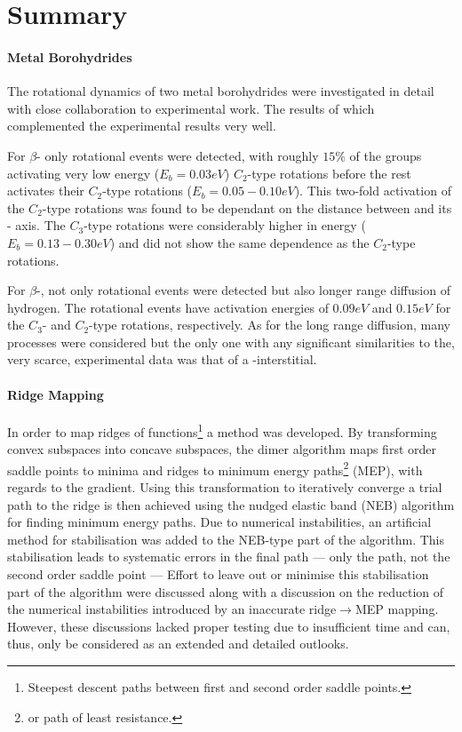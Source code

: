 \chapter{Summary}
\label{chap:summary}

\subsubsection{Metal Borohydrides}
The rotational dynamics of two metal borohydrides were investigated in detail with close collaboration to experimental work.
The results of which complemented the experimental results very well.

For $\beta$- only rotational events were detected, with roughly $15\%$ of the  groups activating very low energy ($E_b = 0.03\unit{eV}$) $C_2$-type rotations before the rest activates their $C_2$-type rotations ($E_b = 0.05 - 0.10 \unit{eV}$).
This two-fold activation of the $C_2$-type rotations was found to be dependant on the distance between  and its - axis.
The $C_3$-type rotations were considerably higher in energy ($E_b = 0.13 - 0.30 \unit{eV}$) and did not show the same dependence as the $C_2$-type rotations.

For $\beta$-, not only rotational events were detected but also longer range diffusion of hydrogen.
The rotational events have activation energies of $0.09 \unit{eV}$ and $0.15\unit{eV}$ for the $C_3$- and $C_2$-type rotations, respectively.
As for the long range diffusion, many processes were considered but the only one with any significant similarities to the, very scarce, experimental data was that of a -interstitial.

\subsubsection{Ridge Mapping}
In order to map ridges of functions\footnote{Steepest descent paths between first and second order saddle points.} a method was developed.
By transforming convex subspaces into concave subspaces, the dimer algorithm maps first order saddle points to minima and ridges to minimum energy paths\footnote{or path of least resistance.} (MEP), with regards to the gradient.
Using this transformation to iteratively converge a trial path to the ridge is then achieved using the nudged elastic band (NEB) algorithm for finding minimum energy paths.
Due to numerical instabilities, an artificial method for stabilisation was added to the NEB-type part of the algorithm.
This stabilisation leads to systematic errors in the final path --- only the path, not the second order saddle point ---
Effort to leave out or minimise this stabilisation part of the algorithm were discussed along with a discussion on the reduction of the numerical instabilities introduced by an inaccurate ridge$\rightarrow$MEP mapping.
However, these discussions lacked proper testing due to insufficient time and can, thus, only be considered as an extended and detailed outlooks.

